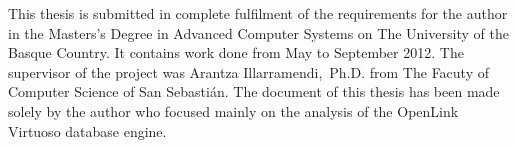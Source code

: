 
This thesis is submitted in complete fulfilment of the requirements for the
author in the Masters’s Degree in Advanced Computer Systems on The University of
the Basque Country. It contains work done from May to September 2012. The
supervisor of the project was Arantza Illarramendi,~Ph.D. from The Facuty of
Computer Science of San Sebastián. The document of this thesis has been made
solely by the author who focused mainly on the analysis of the OpenLink Virtuoso
database engine.
